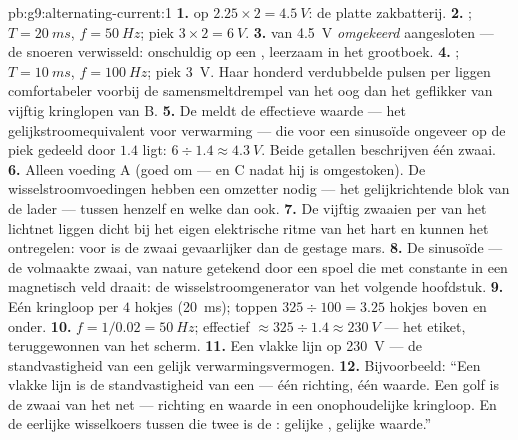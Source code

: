 \begin{solution}{pb:g9:alternating-current:1}
\textbf{1.}  op $2.25 \times 2 = \qty{4.5}{V}$: de platte
zakbatterij.
\textbf{2.} ; $T = \qty{20}{ms}$, $f = \qty{50}{Hz}$; piek
$3 \times 2 = \qty{6}{V}$.
\textbf{3.}  van \qty{4.5}{V} \emph{omgekeerd} aangesloten
--- de snoeren verwisseld: onschuldig op een , leerzaam in
het grootboek.
\textbf{4.} ; $T = \qty{10}{ms}$, $f = \qty{100}{Hz}$; piek
\qty{3}{V}. Haar honderd verdubbelde pulsen per  liggen
comfortabeler voorbij de samensmeltdrempel van het oog dan het
geflikker van vijftig kringlopen van B.
\textbf{5.} De  meldt de effectieve waarde --- het
gelijkstroomequivalent voor verwarming --- die voor een sinusoïde
ongeveer op de piek gedeeld door $1.4$ ligt: $6 \div 1.4 \approx
\qty{4.3}{V}$. Beide getallen beschrijven één zwaai.
\textbf{6.} Alleen voeding A (goed om --- en C nadat hij is
omgestoken). De wisselstroomvoedingen hebben een omzetter nodig --- het
gelijkrichtende blok van de lader --- tussen henzelf en welke
 dan ook.
\textbf{7.} De vijftig zwaaien per  van het lichtnet liggen
dicht bij het eigen elektrische ritme van het hart en kunnen het
ontregelen:  voor  is de zwaai
gevaarlijker dan de gestage mars.
\textbf{8.} De sinusoïde --- de volmaakte zwaai, van nature getekend
door een spoel die met constante  in een magnetisch
veld draait: de wisselstroomgenerator van het volgende hoofdstuk.
\textbf{9.} Eén kringloop per $4$ hokjes (\qty{20}{ms}); toppen $325
\div 100 = 3.25$ hokjes boven en onder.
\textbf{10.} $f = 1/0.02 = \qty{50}{Hz}$; effectief $\approx 325 \div
1.4 \approx \qty{230}{V}$ --- het etiket, teruggewonnen van het scherm.
\textbf{11.} Een vlakke lijn op \qty{230}{V} --- de standvastigheid van
een gelijk verwarmingsvermogen.
\textbf{12.} Bijvoorbeeld: ``Een vlakke lijn is de standvastigheid van
een  --- één richting, één waarde. Een golf is de zwaai
van het net --- richting en waarde in een onophoudelijke kringloop. En
de eerlijke wisselkoers tussen die twee is de
: gelijke , gelijke
waarde.''
\end{solution}
